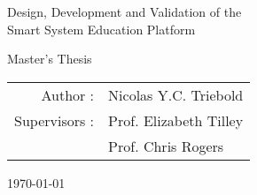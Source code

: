 \newpage%
\clearpage%

\begin{titlepage}%



\begin{center}

%




\vspace*{5cm}%
{\Huge Design, Development and Validation of the \\Smart System Education Platform\par}%

\vspace{2.5cm}%
{\LARGE Master's Thesis}
\vspace{2.5cm}%
        
{\large\begin{tabular}{rl}
    Author : & Nicolas Y.C. Triebold \\
    Supervisors :   & Prof. Elizabeth Tilley \\
                    & Prof. Chris Rogers \\
    \end{tabular}}%
\vfill%
\today%
\end{center}%
\end{titlepage}%